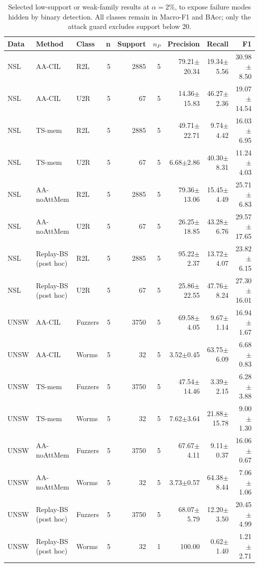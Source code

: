 \begin{table}[t]
\centering\scriptsize
\setlength{\tabcolsep}{3.8pt}
\caption{Selected low-support or weak-family results at $\alpha=2\%$, to expose failure modes hidden by binary detection. All classes remain in Macro-F1 and BAcc; only the attack guard excludes support below 20.}\label{tab:per-class}
\begin{tabular}{lllrrrrrr}
\toprule
Data & Method & Class & n & Support & $n_P$ & Precision & Recall & F1 \\
\midrule
NSL & AA-CIL & R2L & 5 & 2885 & 5 & 79.21$\pm$20.34 & 19.34$\pm$5.56 & 30.98$\pm$8.50 \\
NSL & AA-CIL & U2R & 5 & 67 & 5 & 14.36$\pm$15.83 & 46.27$\pm$2.36 & 19.07$\pm$14.54 \\
NSL & TS-mem & R2L & 5 & 2885 & 5 & 49.71$\pm$22.71 & 9.74$\pm$4.42 & 16.03$\pm$6.95 \\
NSL & TS-mem & U2R & 5 & 67 & 5 & 6.68$\pm$2.86 & 40.30$\pm$8.31 & 11.24$\pm$4.03 \\
NSL & AA-noAttMem & R2L & 5 & 2885 & 5 & 79.36$\pm$13.06 & 15.45$\pm$4.49 & 25.71$\pm$6.83 \\
NSL & AA-noAttMem & U2R & 5 & 67 & 5 & 26.25$\pm$18.85 & 43.28$\pm$6.76 & 29.57$\pm$17.65 \\
NSL & Replay-BS (post hoc) & R2L & 5 & 2885 & 5 & 95.22$\pm$2.37 & 13.72$\pm$4.07 & 23.82$\pm$6.15 \\
NSL & Replay-BS (post hoc) & U2R & 5 & 67 & 5 & 25.86$\pm$22.55 & 47.76$\pm$8.24 & 27.30$\pm$16.01 \\
UNSW & AA-CIL & Fuzzers & 5 & 3750 & 5 & 69.58$\pm$4.05 & 9.67$\pm$1.14 & 16.94$\pm$1.67 \\
UNSW & AA-CIL & Worms & 5 & 32 & 5 & 3.52$\pm$0.45 & 63.75$\pm$6.09 & 6.68$\pm$0.83 \\
UNSW & TS-mem & Fuzzers & 5 & 3750 & 5 & 47.54$\pm$14.46 & 3.39$\pm$2.15 & 6.28$\pm$3.88 \\
UNSW & TS-mem & Worms & 5 & 32 & 5 & 7.62$\pm$3.64 & 21.88$\pm$15.78 & 9.00$\pm$1.30 \\
UNSW & AA-noAttMem & Fuzzers & 5 & 3750 & 5 & 67.67$\pm$4.11 & 9.11$\pm$0.37 & 16.06$\pm$0.67 \\
UNSW & AA-noAttMem & Worms & 5 & 32 & 5 & 3.73$\pm$0.57 & 64.38$\pm$8.44 & 7.06$\pm$1.06 \\
UNSW & Replay-BS (post hoc) & Fuzzers & 5 & 3750 & 5 & 68.07$\pm$5.79 & 12.20$\pm$3.50 & 20.45$\pm$4.99 \\
UNSW & Replay-BS (post hoc) & Worms & 5 & 32 & 1 & 100.00 & 0.62$\pm$1.40 & 1.21$\pm$2.71 \\

\end{tabular}
\end{table}

